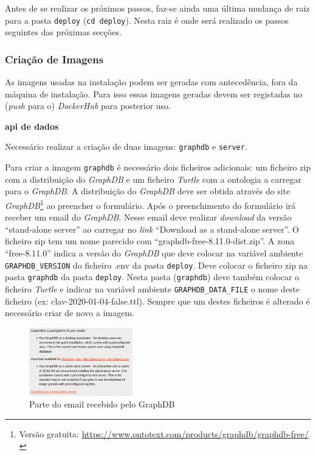 Antes de se realizar os próximos passos, faz-se ainda uma última mudança de raiz para a pasta \texttt{deploy} (\verb|cd deploy|). Nesta raiz é onde será realizado os passos seguintes das próximas secções.
\subsubsection{Criação de Imagens}

As imagens usadas na instalação podem ser geradas com antecedência, fora da máquina de instalação. Para isso essas imagens geradas devem ser registadas no (\textit{push} para o) \textit{DockerHub} para posterior uso.

\begin{description}
    \item \textbf{\acrshort{api} de dados}

    Necessário realizar a criação de duas imagens: \texttt{graphdb} e \texttt{server}.

    Para criar a imagem \texttt{graphdb} é necessário dois ficheiros adicionais: um ficheiro zip com a distribuição do \textit{GraphDB} e um ficheiro \textit{Turtle} com a ontologia a carregar para o \textit{GraphDB}. A distribuição do \textit{GraphDB} deve ser obtida através do site \textit{GraphDB}\footnote{Versão gratuita: \url{https://www.ontotext.com/products/graphdb/graphdb-free/}} ao preencher o formulário. Após o preenchimento do formulário irá receber um email do \textit{GraphDB}. Nesse email deve realizar \textit{download} da versão ``stand-alone server'' ao carregar no \textit{link} ``Download as a stand-alone server''. O ficheiro zip tem um nome parecido com ``graphdb-free-8.11.0-dist.zip''. A zona ``free-8.11.0'' indica a versão do \textit{GraphDB} que deve colocar na variável ambiente \texttt{GRAPHDB\_VERSION} do ficheiro .env da pasta \texttt{deploy}. Deve colocar o ficheiro zip na pasta \texttt{graphdb} da pasta \texttt{deploy}. Nesta pasta (\texttt{graphdb}) deve também colocar o ficheiro \textit{Turtle} e indicar na variável ambiente \texttt{GRAPHDB\_DATA\_FILE} o nome deste ficheiro (ex: clav-2020-01-04-false.ttl). Sempre que um destes ficheiros é alterado é necessário criar de novo a imagem.

    \begin{figure}[H]
        \begin{center}
        \includegraphics[width=0.4\textwidth]{img/graphdb_email.png}
        \end{center}
        \caption{Parte do email recebido pelo GraphDB\label{fig:instalacao-email}}
    \end{figure}


\end{description}
